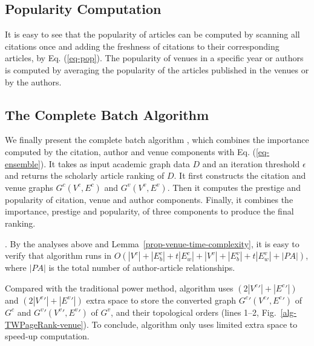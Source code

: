 \subsection{Popularity Computation}
\label{subsec-popularity}

It is easy to see that the popularity of articles can be computed by scanning all citations once and adding the freshness of citations to their corresponding articles, by Eq. (\ref{eq-pop}).
%
The popularity of venues in a specific year or authors is computed by averaging the popularity of the articles published in the venues or by the authors.



\subsection{The Complete Batch Algorithm}
\label{subsec-bat-alg}

We finally present the complete batch algorithm \batensemble, which combines the importance computed by the citation, author and venue components with Eq. (\ref{eq-ensemble}). It takes as input academic graph data $D$ and an iteration threshold $\epsilon$ and returns the scholarly article ranking of $D$. It first constructs the citation and venue graphs $G^c(V^c,E^c)$ and $G^v(V^v,E^v)$. Then it computes the prestige and popularity of citation, venue and author components.
Finally, it combines the importance, \ie prestige and popularity, of three components to produce the final ranking.

. By the analyses above and Lemma~\ref{prop-venue-time-complexity}, it is easy to verify that algorithm \batensemble runs in $O(|V^c|+|E^c_b|+t|E^c_w|+|V^v|+|E^v_b|+t|E^v_w|+|PA|)$, where $|PA|$ is the total number of author-article relationships.


Compared with the traditional power method, algorithm \batensemble uses $(2|V^c{'}|+|E^c{'}|)$ and $(2|V^v{'}|+|E^v{'}|)$ extra space to store the converted graph $G^c{'}(V^c{'},E^c{'})$ of $G^c$ and $G^v{'}(V^v{'},E^v{'})$ of $G^v$, and their topological orders (lines 1--2, Fig.~\ref{alg-TWPageRank-venue}). To conclude, algorithm \batensemble only uses limited extra space to speed-up computation.







